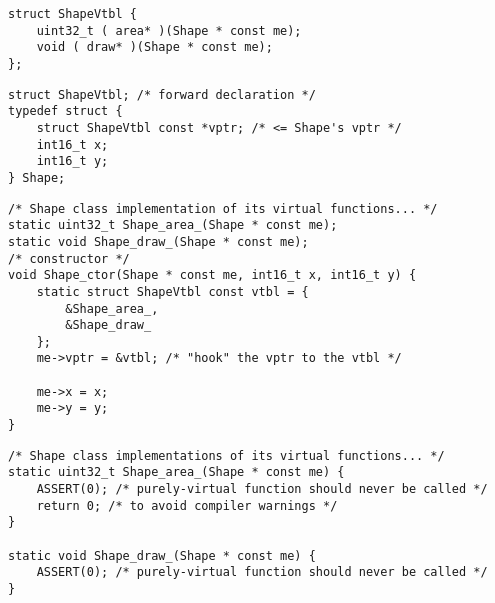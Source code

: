 \begin{lstlisting}[caption={Shape virtual table}, label={lst:Shapt_virt_table}]
struct ShapeVtbl {
    uint32_t ( area* )(Shape * const me); 
    void ( draw* )(Shape * const me);
};
\end{lstlisting}


\begin{lstlisting}[caption={Adding virtual pointer to Shape class}, label={lst:Shapt_virt_pointer}]
struct ShapeVtbl; /* forward declaration */ 
typedef struct {
    struct ShapeVtbl const *vptr; /* <= Shape's vptr */
    int16_t x;
    int16_t y;
} Shape;
\end{lstlisting}


\begin{lstlisting}[caption={Defining the virtual table and initializing the virtual pointer}, label={lst:Shape_vtbl_vptr}]
/* Shape class implementation of its virtual functions... */ 
static uint32_t Shape_area_(Shape * const me);
static void Shape_draw_(Shape * const me);
/* constructor */
void Shape_ctor(Shape * const me, int16_t x, int16_t y) {
    static struct ShapeVtbl const vtbl = { 
        &Shape_area_,
        &Shape_draw_
    };
    me->vptr = &vtbl; /* "hook" the vptr to the vtbl */

    me->x = x;
    me->y = y; 
}
\end{lstlisting}


\begin{lstlisting}[caption={Defining purely virtual functions}, label={lst:Pure_virt}]
/* Shape class implementations of its virtual functions... */ 
static uint32_t Shape_area_(Shape * const me) {
    ASSERT(0); /* purely-virtual function should never be called */
    return 0; /* to avoid compiler warnings */ 
}
    
static void Shape_draw_(Shape * const me) {
    ASSERT(0); /* purely-virtual function should never be called */
}
\end{lstlisting}


